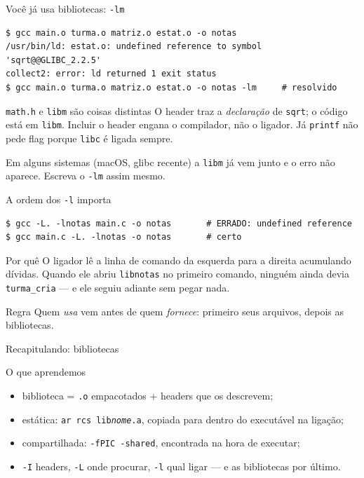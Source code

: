\documentclass[aspectratio=169]{beamer}
\begin{document}
\begin{frame}[fragile]{Você já usa bibliotecas: \texttt{-lm}}
\begin{lstlisting}[style=shellStyle]
$ gcc main.o turma.o matriz.o estat.o -o notas
/usr/bin/ld: estat.o: undefined reference to symbol 'sqrt@@GLIBC_2.2.5'
collect2: error: ld returned 1 exit status
$ gcc main.o turma.o matriz.o estat.o -o notas -lm     # resolvido
\end{lstlisting}
  \begin{block}{\texttt{math.h} e \texttt{libm} são coisas distintas}
    \small O header traz a \emph{declaração} de \texttt{sqrt}; o código está
    em \texttt{libm}. Incluir o header engana o compilador, não o ligador.
    Já \texttt{printf} não pede flag porque \texttt{libc} é ligada sempre.
  \end{block}
  \begin{alertblock}{}
    \small Em alguns sistemas (macOS, glibc recente) a \texttt{libm} já vem
    junto e o erro não aparece. Escreva o \texttt{-lm} assim mesmo.
  \end{alertblock}
\end{frame}

\begin{frame}[fragile]{A ordem dos \texttt{-l} importa}
\begin{lstlisting}[style=shellStyle]
$ gcc -L. -lnotas main.c -o notas       # ERRADO: undefined reference
$ gcc main.c -L. -lnotas -o notas       # certo
\end{lstlisting}
  \begin{block}{Por quê}
    \small O ligador lê a linha de comando da esquerda para a direita
    acumulando dívidas. Quando ele abriu \texttt{libnotas} no primeiro
    comando, ninguém ainda devia \texttt{turma\_cria} --- e ele seguiu adiante
    sem pegar nada.
  \end{block}
  \begin{block}{Regra}
    \small Quem \emph{usa} vem antes de quem \emph{fornece}: primeiro seus
    arquivos, depois as bibliotecas.
  \end{block}
\end{frame}

\begin{frame}{Recapitulando: bibliotecas}
  \begin{block}{O que aprendemos}
    \begin{itemize}
      \item biblioteca = \texttt{.o} empacotados + headers que os descrevem;
      \item estática: \texttt{ar rcs lib\emph{nome}.a}, copiada para dentro do
        executável na ligação;
      \item compartilhada: \texttt{-fPIC -shared}, encontrada na hora de
        executar;
      \item \texttt{-I} headers, \texttt{-L} onde procurar, \texttt{-l} qual
        ligar --- e as bibliotecas por último.
    \end{itemize}
  \end{block}
\end{frame}
\end{document}
